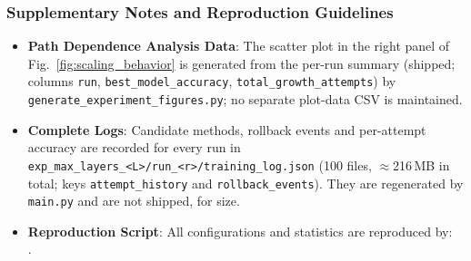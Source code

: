 \begin{table}[htbp]
    \centering
    \caption{Statistical results under different maximum layer settings. Failure rate is defined as the proportion of runs where \texttt{total\_growth\_attempts=2500}. The bolded row indicates the optimal balance point between performance and efficiency.}
    \label{tab:convergence_stats_appendix}
\end{table}

\subsubsection{Supplementary Notes and Reproduction Guidelines}
\begin{itemize}
    \item \textbf{Path Dependence Analysis Data}: The scatter plot in the right panel of Fig.~\ref{fig:scaling_behavior} is generated from the per-run summary  (shipped; columns \texttt{run}, \texttt{best\_model\_accuracy}, \texttt{total\_growth\_attempts}) by \texttt{generate\_experiment\_figures.py}; no separate plot-data CSV is maintained.
    \item \textbf{Complete Logs}: Candidate methods, rollback events and per-attempt accuracy are recorded for every run in \texttt{exp\_max\_layers\_\textless L\textgreater/run\_\textless r\textgreater/training\_log.json} (100 files, $\approx$216\,MB in total; keys \texttt{attempt\_history} and \texttt{rollback\_events}). They are regenerated by \texttt{main.py} and are not shipped, for size.
    \item \textbf{Reproduction Script}: All configurations and statistics are reproduced by:\\
    .
\end{itemize}

